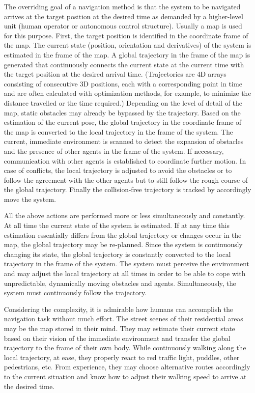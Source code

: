 The overriding goal of a navigation method is that the system to be navigated arrives at the target position at the desired time
as demanded by a higher-level unit (human operator or autonomous control structure).
Usually a map is used for this purpose.
First, the target position is identified in the coordinate frame of the map.
The current state (position, orientation and derivatives) of the system is estimated in the frame of the map.
A global trajectory in the frame of the map is generated 
that continuously connects the current state at the current time with the target position at the desired arrival time.
(Trajectories are 4D arrays consisting of consecutive 3D positions, each with a corresponding point in time and are
often calculated with optimization methods, for example, to minimize the distance travelled or the time required.)
Depending on the level of detail of the map, static obstacles may already be bypassed by the trajectory.
Based on the estimation of the current pose, 
the global trajectory in the coordinate frame of the map is converted to the local trajectory in the frame of the system.
The current, immediate environment is scanned to detect the expansion of obstacles 
and the presence of other agents in the frame of the system.
If necessary, communication with other agents is established to coordinate further motion.
In case of conflicts, the local trajectory is adjusted to avoid the obstacles or to follow the agreement with the other agents
but to still follow the rough course of the global trajectory.
Finally the collision-free trajectory is tracked by accordingly move the system.

All the above actions are performed more or less simultaneously and constantly.
At all time the current state of the system is estimated. 
If at any time this estimation essentially differs from the global trajectory or changes occur in the map, 
the global trajectory may be re-planned.
Since the system is continuously changing its state, the global trajectory is constantly converted to the local trajectory in the frame of the system.
The system must perceive the environment and may adjust the local trajectory at all times 
in order to be able to cope with unpredictable, dynamically moving obstacles and agents.
Simultaneously, the system must continuously follow the trajectory.

Considering the complexity, it is admirable how humans can accomplish the navigation task without much effort.
The street scenes of their residential areas may be the map stored in their mind.
They may estimate their current state based on their vision of the immediate environment
and transfer the global trajectory to the frame of their own body.
While continuously walking along the local trajectory,
at ease, they properly react to red traffic light, puddles, other pedestrians, etc.
From experience, they may choose alternative routes accordingly to the current situation and
know how to adjust their walking speed to arrive at the desired time.







